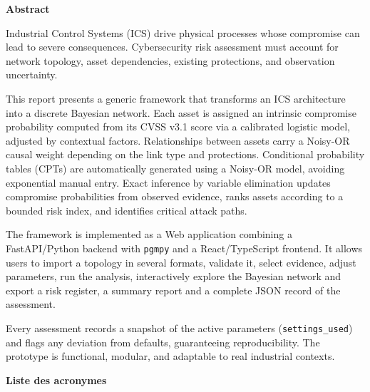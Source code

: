 \documentclass[12pt,a4paper]{article}
\newcommand{\unnumberedsection}[1]{%
  \phantomsection
  {\normalfont\Large\bfseries\sffamily\color{primary}#1\par}
  \vspace{-2pt}{\color{secondary!70}\rule{\linewidth}{0.8pt}}
  \vspace{1.6ex plus 0.2ex}%
}
\begin{document}
\thispagestyle{empty}
\unnumberedsection{Abstract}

\begin{abstractbox}
Industrial Control Systems (ICS) drive physical processes whose compromise can lead to severe consequences. Cybersecurity risk assessment must account for network topology, asset dependencies, existing protections, and observation uncertainty.

This report presents a generic framework that transforms an ICS architecture into a discrete Bayesian network. Each asset is assigned an intrinsic compromise probability computed from its CVSS v3.1 score via a calibrated logistic model, adjusted by contextual factors. Relationships between assets carry a Noisy-OR causal weight depending on the link type and protections. Conditional probability tables (CPTs) are automatically generated using a Noisy-OR model, avoiding exponential manual entry. Exact inference by variable elimination updates compromise probabilities from observed evidence, ranks assets according to a bounded risk index, and identifies critical attack paths.

The framework is implemented as a Web application combining a FastAPI/Python backend with \texttt{pgmpy} and a React/TypeScript frontend. It allows users to import a topology in several formats, validate it, select evidence, adjust parameters, run the analysis, interactively explore the Bayesian network and export a risk register, a summary report and a complete JSON record of the assessment.

Every assessment records a snapshot of the active parameters (\texttt{settings\_used}) and flags any deviation from defaults, guaranteeing reproducibility. The prototype is functional, modular, and adaptable to real industrial contexts.
\end{abstractbox}

\clearpage
\thispagestyle{empty}
\unnumberedsection{Liste des acronymes}
\end{document}
